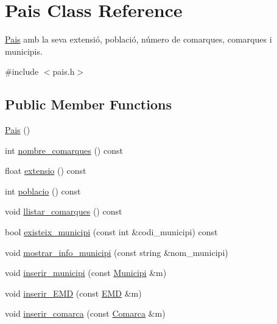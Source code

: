 \hypertarget{classPais}{}\section{Pais Class Reference}
\label{classPais}


\hyperlink{classPais}{Pais} amb la seva extensió, població, número de comarques, comarques i municipis.  




{\ttfamily \#include $<$pais.\+h$>$}

\subsection*{Public Member Functions}
\begin{DoxyCompactItemize}
\item 
\hyperlink{classPais_a16af2b45eb9d07e7292a58556edc9371}{Pais} ()
\item 
int \hyperlink{classPais_a67169ad4c8069867327eac695462f89c}{nombre\+\_\+comarques} () const
\item 
float \hyperlink{classPais_af6b3159f78cd255468f513178760dd1f}{extensio} () const
\item 
int \hyperlink{classPais_af640c7bb35f0fa4799c41ae7e4835cb5}{poblacio} () const
\item 
void \hyperlink{classPais_a246084dd38da8773d7beb428af235234}{llistar\+\_\+comarques} () const
\item 
bool \hyperlink{classPais_a45b3d49b3b3ff239c18d535c48c77697}{existeix\+\_\+municipi} (const int \&codi\+\_\+municipi) const
\item 
void \hyperlink{classPais_a21a52a69fa3a93474ba9c63caab0772a}{mostrar\+\_\+info\+\_\+municipi} (const string \&nom\+\_\+municipi)
\item 
void \hyperlink{classPais_a3f5ad8b10ce4adcd5e0701ca18b3d10d}{inserir\+\_\+municipi} (const \hyperlink{classMunicipi}{Municipi} \&m)
\item 
void \hyperlink{classPais_a3ba9135e6fb76aabb01e5661a5eaf333}{inserir\+\_\+\+E\+MD} (const \hyperlink{classEMD}{E\+MD} \&m)
\item 
void \hyperlink{classPais_add5cd1faf2844c0985bf940fad91cf3f}{inserir\+\_\+comarca} (const \hyperlink{classComarca}{Comarca} \&m)
\end{DoxyCompactItemize}
